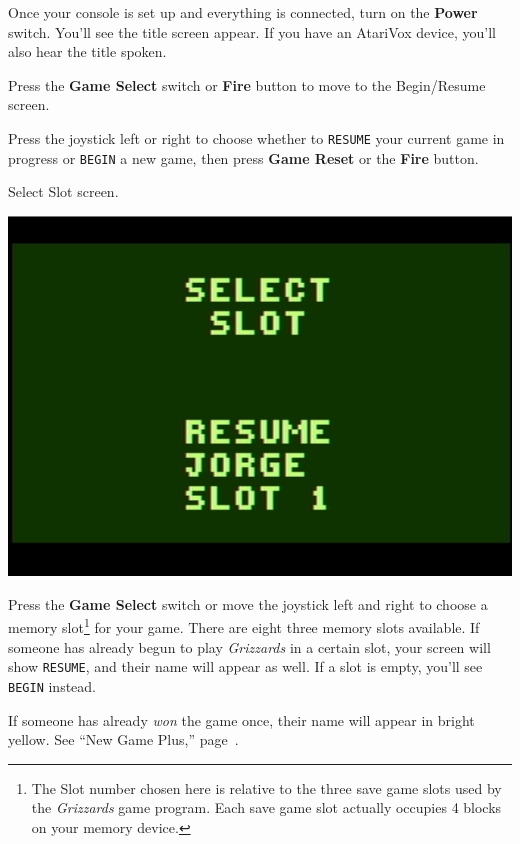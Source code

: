 \documentclass[9pt,twocolumn,openany,article]{memoir}
\begin{document}
Once your  console is set  up and everything  is connected, turn  on the
\textbf{Power} switch. You'll  see the title screen appear.  If you have
an AtariVox device, you'll also hear the title spoken.

Press the \textbf{Game Select} switch or \textbf{Fire} button to move to
the
\ifdefined\NOSAVE
Begin/Resume screen.

Press the  joystick left or  right to choose whether  to \texttt{RESUME}
your current game  in progress or \texttt{BEGIN} a new  game, then press
\textbf{Game Reset} or the \textbf{Fire} button.

\else
Select Slot screen.

\begin{center}
  \includegraphics[width=.75\columnwidth]{../Manual/SelectSlotNTSC.png}
\end{center}

Press  the \textbf{Game  Select} switch  or move  the joystick  left and
right to  choose a  memory slot\ifdefined\ATARIAGESAVE\else\footnote{The
  Slot number chosen here is relative  to the three save game slots used
  by the \textit{Grizzards}  game program. Each save  game slot actually
  occupies  4  blocks  on  your  memory  device.}\fi{}  for  your  game.
There  are \ifdefined\ATARIAGESAVE  eight \else  three \fi  memory slots
available. If  someone has  already begun  to play  \textit{Grizzards} in
a certain  slot, your  screen will  show \texttt{RESUME},  and their
name  will   appear  as   well.  If   a  slot   is  empty,   you'll  see
\texttt{BEGIN} instead.

If someone has already \emph{won} the  game once, their name will appear
in bright yellow. See ``New Game Plus,'' page~\pageref{sec:NewGamePlus}.

\ifdefined\DEMO

\skip
\end{document}
